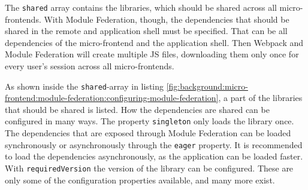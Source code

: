 \noindent The \texttt{shared} array contains the libraries, which should be shared across all micro-frontends. With Module Federation, though, the dependencies that should be shared in the remote and application shell must be specified. That can be all dependencies of the micro-frontend and the application shell. Then Webpack and Module Federation will create multiple \ac{JS} files, downloading them only once for every user's session across all micro-frontends. \cite[125]{book:2021:mezzalira:applied-methods:building-micro-frontends}

\bigskip

\noindent As shown inside the \texttt{shared}-array in listing \ref{fig:background:micro-frontend:module-federation:configuring-module-federation}, a part of the libraries that should be shared is listed. How the dependencies are shared can be configured in many ways. The property \texttt{singleton} only loads the library once. The dependencies that are exposed through Module Federation can be loaded synchronously or asynchronously through the \texttt{eager} property. It is recommended to load the dependencies asynchronously, as the application can be loaded faster. With \texttt{requiredVersion} the version of the library can be configured. These are only some of the configuration properties available, and many more exist. \cite[125]{book:2021:mezzalira:applied-methods:building-micro-frontends}
